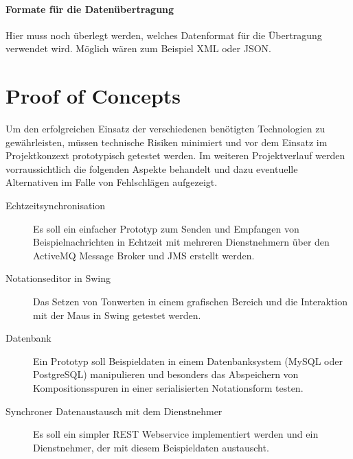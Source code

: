 \paragraph*{Formate für die Datenübertragung}
Hier muss noch überlegt werden, welches Datenformat für die Übertragung verwendet wird. Möglich wären zum Beispiel XML oder JSON.

\section{Proof of Concepts}
Um den erfolgreichen Einsatz der verschiedenen benötigten Technologien zu gewährleisten, müssen technische Risiken minimiert und vor dem Einsatz im Projektkonzext prototypisch getestet werden. Im weiteren Projektverlauf werden vorraussichtlich die folgenden Aspekte behandelt und dazu eventuelle Alternativen im Falle von Fehlschlägen aufgezeigt.

\begin{description}
\item[Echtzeitsynchronisation]
Es soll ein einfacher Prototyp zum Senden und Empfangen von Beispielnachrichten in Echtzeit mit mehreren Dienstnehmern über den ActiveMQ Message Broker und JMS erstellt werden.
\item[Notationseditor in Swing]
Das Setzen von Tonwerten in einem grafischen Bereich und die Interaktion mit der Maus in Swing getestet werden.
\item[Datenbank]
Ein Prototyp soll Beispieldaten in einem Datenbanksystem (MySQL oder PostgreSQL) manipulieren und besonders das Abspeichern von Kompositionsspuren in einer serialisierten Notationsform testen.
\item[Synchroner Datenaustausch mit dem Dienstnehmer]
Es soll ein simpler REST Webservice implementiert werden und ein Dienstnehmer, der mit diesem Beispieldaten austauscht.
\end{description}

